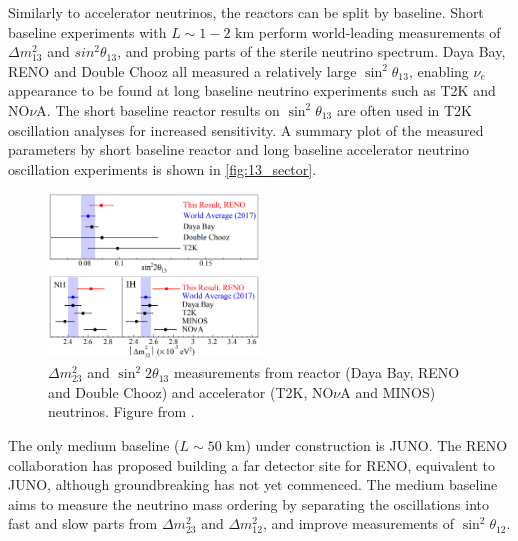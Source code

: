 Similarly to accelerator neutrinos, the reactors can be split by baseline. Short baseline experiments with $L\sim1-2\text{ km}$ perform world-leading measurements of $\Delta m^2_{13}$ and $sin^2\theta_{13}$, and probing parts of the sterile neutrino spectrum. Daya Bay\cite{daya_bay_disc}, RENO\cite{reno_disc} and Double Chooz\cite{double_chooz} all measured a relatively large $\sin^2 \theta_{13}$, enabling $\nu_e$ appearance to be found at long baseline neutrino experiments such as T2K and NO$\nu$A. The short baseline reactor results on $\sin^2\theta_{13}$ are often used in T2K oscillation analyses for increased sensitivity. A summary plot of the measured parameters by short baseline reactor and long baseline accelerator neutrino oscillation experiments is shown in \autoref{fig:13_sector}.
\begin{figure}[h]
	\includegraphics[width=0.5\textwidth, trim={0mm 0mm 0mm 0mm}, clip,page=1]{figures/theory/reno_theta_dm13}
	\caption{$\Delta m^2_{23}$ and $\sin^2 2\theta_{13}$ measurements from reactor (Daya Bay\cite{daya_bay}, RENO\cite{reno_new} and Double Chooz\cite{double_chooz_old}) and accelerator (T2K\cite{t2k_2015}, NO$\nu$A\cite{nova_2017} and MINOS\cite{minos_numu_nue}) neutrinos. Figure from \cite{reno_new}.}
	\label{fig:13_sector}
\end{figure}

The only medium baseline ($L\sim50\text{ km}$) under construction is JUNO\cite{juno}. The RENO collaboration has proposed\cite{reno_50} building a far detector site for RENO, equivalent to JUNO, although groundbreaking has not yet commenced. The medium baseline aims to measure the neutrino mass ordering by separating the oscillations into fast and slow parts from $\Delta m^2_{23}$ and $\Delta m^2_{12}$, and improve measurements of $\sin^2 \theta_{12}$.

